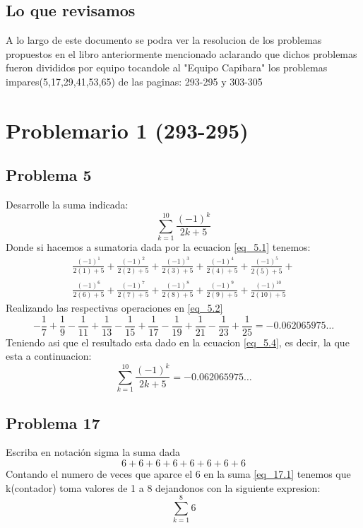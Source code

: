 \documentclass{article}
\begin{document}
  \subsection{Lo que revisamos}
    A lo largo de este documento se podra ver la resolucion de los problemas propuestos en el libro anteriormente mencionado aclarando que dichos problemas fueron divididos por equipo tocandole al "Equipo Capibara" los problemas impares(5,17,29,41,53,65) de las paginas: 293-295 y 303-305
  \section{Problemario 1 (293-295)}
  
      \subsection{Problema 5}
        Desarrolle la suma indicada:
       \begin{equation}\label{eq_5.1}
        \sum_{k=1}^{10}\frac{(-1)^k}{2k+5}
       \end{equation}
       Donde si hacemos a sumatoria dada por la ecuacion \ref{eq_5.1} tenemos:
       \begin{equation}\label{eq_5.2}
        \begin{split}
          \frac{(-1)^1}{2(1)+5}+\frac{(-1)^2}{2(2)+5}+\frac{(-1)^3}{2(3)+5}+\frac{(-1)^4}{2(4)+5}+\frac{(-1)^5}{2(5)+5}+\\\frac{(-1)^6}{2(6)+5}+\frac{(-1)^7}{2(7)+5}+\frac{(-1)^8}{2(8)+5}+\frac{(-1)^9}{2(9)+5}+\frac{(-1)^{10}}{2(10)+5}
        \end{split}
       \end{equation}
       Realizando las respectivas operaciones en \ref{eq_5.2}
       \begin{equation}\label{eq_5.3}
          -\frac{1}{7}+\frac{1}{9}-\frac{1}{11}+\frac{1}{13}-\frac{1}{15}+\frac{1}{17}-\frac{1}{19}+\frac{1}{21}-\frac{1}{23}+\frac{1}{25} = -0.062065975\dots
       \end{equation}
       Teniendo asi que el resultado esta dado en la ecuacion \ref{eq_5.4}, es decir, la que esta a continuacion: 
       \begin{equation}\label{eq_5.4}
        \sum_{k=1}^{10}\frac{(-1)^k}{2k+5} = -0.062065975\dots
       \end{equation}
      \subsection{Problema 17}
       Escriba en notación sigma la suma dada
       \setcounter{equation}{0}
       \begin{equation}\label{eq_17.1}
        6+6+6+6+6+6+6+6
       \end{equation}
       Contando el numero de veces que aparce el 6 en la suma \ref{eq_17.1} tenemos que k(contador) toma valores de 1 a 8 dejandonos con la siguiente expresion:
       \begin{equation}\label{eq_17.2}
        \sum_{k=1}^{8}6
       \end{equation}
       \setcounter{equation}{0}
\end{document}
